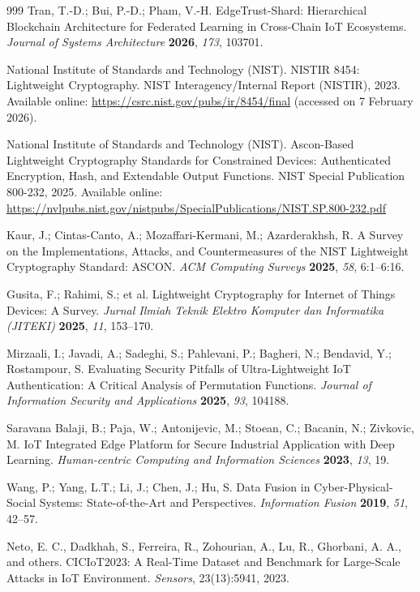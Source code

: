 \documentclass[journal,article,submit,moreauthors]{Definitions/mdpi}
\begin{document}
{\begin{thebibliography}{999}
Tran, T.-D.; Bui, P.-D.; Pham, V.-H. EdgeTrust-Shard: Hierarchical Blockchain Architecture for Federated Learning in Cross-Chain IoT Ecosystems. \emph{Journal of Systems Architecture} \textbf{2026}, \emph{173}, 103701.

National Institute of Standards and Technology (NIST). NISTIR 8454: Lightweight Cryptography.
NIST Interagency/Internal Report (NISTIR), 2023. Available online: \url{https://csrc.nist.gov/pubs/ir/8454/final} (accessed on 7 February 2026).

National Institute of Standards and Technology (NIST). Ascon-Based Lightweight Cryptography Standards for Constrained Devices: Authenticated Encryption, Hash, and Extendable Output Functions.
NIST Special Publication 800-232, 2025. Available online: \url{https://nvlpubs.nist.gov/nistpubs/SpecialPublications/NIST.SP.800-232.pdf}

Kaur, J.; Cintas-Canto, A.; Mozaffari-Kermani, M.; Azarderakhsh, R. A Survey on the Implementations, Attacks, and Countermeasures of the NIST Lightweight Cryptography Standard: ASCON. \emph{ACM Computing Surveys} \textbf{2025}, \emph{58}, 6:1--6:16.

Gusita, F.; Rahimi, S.; et al. Lightweight Cryptography for Internet of Things Devices: A Survey.
\emph{Jurnal Ilmiah Teknik Elektro Komputer dan Informatika (JITEKI)} \textbf{2025}, \emph{11}, 153--170.

Mirzaali, I.; Javadi, A.; Sadeghi, S.; Pahlevani, P.; Bagheri, N.; Bendavid, Y.; Rostampour, S. Evaluating Security Pitfalls of Ultra-Lightweight IoT Authentication: A Critical Analysis of Permutation Functions. \emph{Journal of Information Security and Applications} \textbf{2025}, \emph{93}, 104188.

Saravana Balaji, B.; Paja, W.; Antonijevic, M.; Stoean, C.; Bacanin, N.; Zivkovic, M. IoT Integrated Edge Platform for Secure Industrial Application with Deep Learning. \emph{Human-centric Computing and Information Sciences} \textbf{2023}, \emph{13}, 19.

Wang, P.; Yang, L.T.; Li, J.; Chen, J.; Hu, S. Data Fusion in Cyber-Physical-Social Systems: State-of-the-Art and Perspectives. \emph{Information Fusion} \textbf{2019}, \emph{51}, 42--57.

Neto, E. C., Dadkhah, S., Ferreira, R., Zohourian, A., Lu, R., Ghorbani, A. A., and others. CICIoT2023: A Real-Time Dataset and Benchmark for Large-Scale Attacks in IoT Environment. \emph{Sensors}, 23(13):5941, 2023.


\end{thebibliography}}
\end{document}

